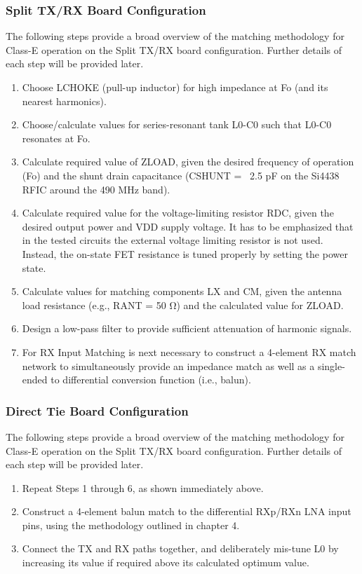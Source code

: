       \subsubsection{Split TX/RX Board Configuration}
        The following steps provide a broad overview of the matching methodology for Class-E operation on 
        the Split TX/RX board configuration. Further details of each step will be provided later.
        \begin{enumerate}
          \item Choose LCHOKE (pull-up inductor) for high impedance at Fo (and its nearest harmonics).
          \item Choose/calculate values for series-resonant tank L0-C0 such that L0-C0 resonates at Fo.
          \item Calculate required value of ZLOAD, given the desired frequency of operation (Fo) and the 
                shunt drain capacitance (CSHUNT = ~2.5 pF on the Si4438 RFIC around the 490 MHz band).
          \item Calculate required value for the voltage-limiting resistor RDC, given the desired output 
                power and VDD supply voltage. It has to be emphasized that in the tested circuits the 
                external voltage limiting resistor is not used. Instead, the on-state FET resistance is tuned 
                properly by setting the power state.
          \item Calculate values for matching components LX and CM, given the antenna load resistance 
                (e.g., RANT = 50 Ω) and the calculated value for ZLOAD.
          \item Design a low-pass filter to provide sufficient attenuation of harmonic signals.
          \item For RX Input Matching is next necessary to construct a 4-element RX match network to 
                simultaneously provide an impedance match as well as a single-ended to differential 
                conversion function (i.e., balun).
        \end{enumerate}

      \subsubsection{Direct Tie Board Configuration}
        The following steps provide a broad overview of the matching methodology for Class-E operation on 
        the Split TX/RX board configuration. Further details of each step will be provided later.
        \begin{enumerate}
          \item Repeat Steps 1 through 6, as shown immediately above.
          \item Construct a 4-element balun match to the differential RXp/RXn LNA input pins, using the 
                methodology outlined in chapter 4.
          \item Connect the TX and RX paths together, and deliberately mis-tune L0 by increasing its value 
                if required above its calculated optimum value.
        \end{enumerate}
    
